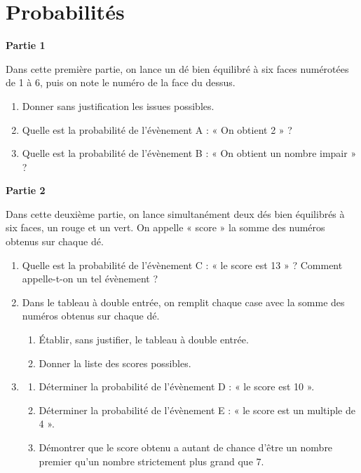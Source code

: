 \documentclass[a4paper,10pt]{report}
\begin{document}
\pagestyle{empty}
\newpage
\section*{Probabilités}

\begin{ex}
\textbf{Partie 1}
	
Dans cette première partie, on lance un dé bien équilibré à six faces numérotées de 1 à 6, puis on note le numéro de la face du dessus.
	
\begin{enumerate}
\item Donner sans justification les issues possibles.
\item Quelle est la probabilité de l'évènement A : « On obtient 2 » ?
\item Quelle est la probabilité de l'évènement B : « On obtient un nombre impair » ?
\end{enumerate}

\textbf{Partie 2}
	
Dans cette deuxième partie, on lance simultanément deux dés bien équilibrés à six faces, un rouge et un vert. On appelle « score » la somme des numéros obtenus sur chaque dé.
	
\begin{enumerate}
\item Quelle est la probabilité de l'évènement C : « le score est 13 » ? Comment appelle-t-on un tel évènement ?
\item Dans le tableau à double entrée, on remplit chaque case avec la somme des numéros obtenus sur chaque dé.
\begin{enumerate}
\item Établir, sans justifier, le tableau à double entrée.		
\item Donner la liste des scores possibles.
\end{enumerate}
\item \begin{enumerate}
\item Déterminer la probabilité de l'évènement D : « le score est 10 ».
\item Déterminer la probabilité de l'évènement E : « le score est un multiple de 4 ».
\item Démontrer que le score obtenu a autant de chance d'être un nombre premier qu'un nombre strictement plus grand que 7.
\end{enumerate}
\end{enumerate}
\end{ex}
\end{document}
